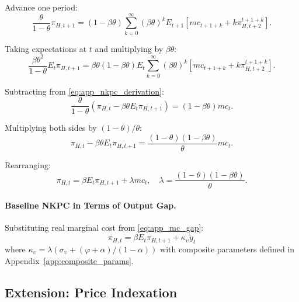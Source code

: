 \documentclass[12pt,a4paper]{article}
\begin{document}
\begin{appendices}
Advance one period:
\begin{equation}
	\frac{\theta}{1-\theta}\pi_{H,t+1} = (1-\beta\theta) \sum_{k=0}^\infty (\beta\theta)^k E_{t+1} [mc_{t+1+k} + k\pi_{H,t+2}^{t+1+k}].
\end{equation}

Taking expectations at $t$ and multiplying by $\beta\theta$:
\begin{equation}
	\frac{\beta\theta^2}{1-\theta}E_t\pi_{H,t+1} = \beta\theta(1-\beta\theta) E_t \sum_{k=0}^\infty (\beta\theta)^k [mc_{t+1+k} + k\pi_{H,t+2}^{t+1+k}].
\end{equation}

Subtracting from \eqref{eq:app_nkpc_derivation}:
\begin{equation}
	\frac{\theta}{1-\theta}(\pi_{H,t} - \beta\theta E_t\pi_{H,t+1}) = (1-\beta\theta) mc_t.
\end{equation}

Multiplying both sides by $(1-\theta)/\theta$:
\begin{equation}
	\pi_{H,t} - \beta\theta E_t\pi_{H,t+1} = \frac{(1-\theta)(1-\beta\theta)}{\theta} mc_t.
\end{equation}

Rearranging:
\begin{equation}
	\pi_{H,t} = \beta E_t\pi_{H,t+1} + \lambda mc_t, \quad \lambda = \frac{(1-\theta)(1-\beta\theta)}{\theta}.
	\label{eq:app_NKPC_mc}
\end{equation}

\paragraph{Baseline NKPC in Terms of Output Gap.}
Substituting real marginal cost from \eqref{eq:app_mc_gap}:
\begin{equation}
	\boxed{\pi_{H,t} = \beta E_t\pi_{H,t+1} + \kappa_\upsilon\tilde{y}_t}
	\label{eq:app_NKPC_baseline}
\end{equation}
where $\kappa_\upsilon = \lambda(\sigma_\upsilon + (\varphi+\alpha)/(1-\alpha))$ with composite parameters defined in Appendix~\ref{app:composite_params}.

\subsection{Extension: Price Indexation}
\label{app:indexation}


\end{appendices}
\end{document}
